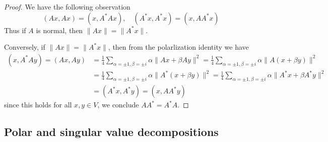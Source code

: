\begin{proof}
We have the following observation
\[(Ax,Ax)=(x,A^*Ax),\quad (A^*x,A^*x)=(x,AA^*x)\]
Thus if $A$ is normal, then $\|Ax\|=\|A^*x\|$.\par
Conversely, if $\|Ax\|=\|A^*x\|$, then from the polarlization identity we have
\begin{align*}
(x,A^*Ay)=(Ax,Ay)&=\frac{1}{4}\sum_{\alpha=\pm 1,\beta=\pm i}\alpha\|Ax+\beta Ay\|^2=\frac{1}{4}\sum_{\alpha=\pm 1,\beta=\pm i}\alpha\|A(x+\beta y)\|^2\\
&=\frac{1}{4}\sum_{\alpha=\pm 1,\beta=\pm i}\alpha\|A^*(x+\beta y)\|^2=\frac{1}{4}\sum_{\alpha=\pm 1,\beta=\pm i}\alpha\|A^*x+\beta A^*y\|^2\\
&=(A^*x,A^*y)=(x,AA^*y)
\end{align*}
since this holds for all $x,y\in V$, we conclude $AA^*=A^*A$.
\end{proof}
\subsection{Polar and singular value decompositions}
